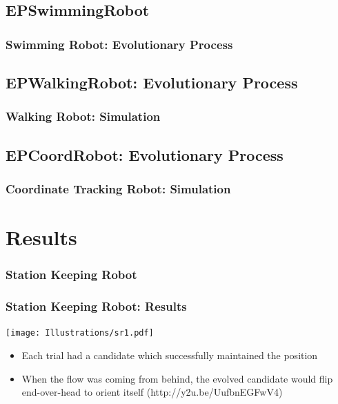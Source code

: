 \documentclass{beamer}
\begin{document}
\subsection{EPSwimmingRobot}
\begin{frame}
  \frametitle{Swimming Robot: Evolutionary Process}
\end{frame}

\subsection{EPWalkingRobot: Evolutionary Process}
\begin{frame}
  \frametitle{Walking Robot: Simulation}
\end{frame}

\subsection{EPCoordRobot: Evolutionary Process}
\begin{frame}
  \frametitle{Coordinate Tracking Robot: Simulation}
\end{frame}

\section{Results}
\subsubsection{Station Keeping Robot} %
\begin{frame}
  \frametitle{Station Keeping Robot: Results}
  \begin{center}


  \texttt{[image: Illustrations/sr1.pdf]}
       \\
    \end{center}
  \begin{itemize}
    \item Each trial had a candidate which successfully maintained the position
        \item When the flow was coming from behind, the evolved candidate would flip end-over-head to orient itself (http://y2u.be/UufbnEGFwV4)
  \end{itemize}
\end{frame}
\end{document}
